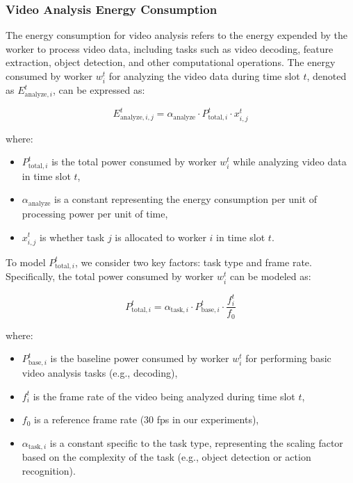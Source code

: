 \subsubsection{Video Analysis Energy Consumption}
The energy consumption for video analysis refers to the energy expended by the worker to process video data, including tasks such as video decoding, feature extraction, object detection, and other computational operations. The energy consumed by worker \( w_i^t \) for analyzing the video data during time slot \( t \), denoted as \( E_{\text{analyze}, i}^t \), can be expressed as:

\[
E_{\text{analyze}, i, j}^t = \alpha_{\text{analyze}} \cdot P_{\text{total}, i}^t \cdot x_{i,j}^t
\]

where:
\begin{itemize}
    \item \( P_{\text{total}, i}^t \) is the total power consumed by worker \( w_i^t \) while analyzing video data in time slot \( t \),
    \item \( \alpha_{\text{analyze}} \) is a constant representing the energy consumption per unit of processing power per unit of time,
    \item \(x_{i,j}^t\) is whether task \(j\) is allocated to worker \(i\) in time slot \(t\).
\end{itemize}

To model \( P_{\text{total}, i}^t \), we consider two key factors: task type and frame rate. Specifically, the total power consumed by worker \( w_i^t \) can be modeled as:

\[
P_{\text{total}, i}^t = \alpha_{\text{task}, i} \cdot P_{\text{base}, i}^t \cdot \frac{f_i^t}{f_0}
\]

where:
\begin{itemize}
    \item \( P_{\text{base}, i}^t \) is the baseline power consumed by worker \( w_i^t \) for performing basic video analysis tasks (e.g., decoding), 
    \item \( f_i^t \) is the frame rate of the video being analyzed during time slot \( t \),
    \item \( f_0 \) is a reference frame rate (30 fps in our experiments), 
    \item \( \alpha_{\text{task}, i} \) is a constant specific to the task type, representing the scaling factor based on the complexity of the task (e.g., object detection or action recognition).
\end{itemize}


